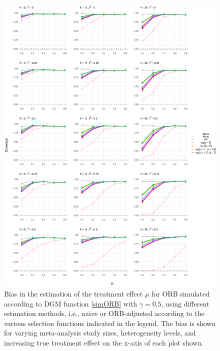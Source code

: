 \documentclass[twocolumn]{article}\usepackage[]{graphicx}\usepackage[]{xcolor}
\makeatletter
\def\maxwidth{ %
  \ifdim\Gin@nat@width>\linewidth
    \linewidth
  \else
    \Gin@nat@width
  \fi
}
\providecommand{\DIFaddbeginFL}{} %
\providecommand{\DIFaddendFL}{} %
\providecommand{\DIFdelbeginFL}{} %
\providecommand{\DIFdelendFL}{} %
\newcommand{\DIFscaledelfig}{0.5}
\newlength{\DIFdelgraphicswidth} %
\newlength{\DIFdelgraphicsheight} %
\newcommand{\DIFaddincludegraphics}[2][]{{\color{blue}\fbox{\DIFOincludegraphics[#1]{#2}}}} %
\newcommand{\DIFdelincludegraphics}[2][]{%
\sbox{\DIFdelgraphicsbox}{\DIFOincludegraphics[#1]{#2}}%
\settoboxwidth{\DIFdelgraphicswidth}{\DIFdelgraphicsbox} %
\settoboxtotalheight{\DIFdelgraphicsheight}{\DIFdelgraphicsbox} %
\scalebox{\DIFscaledelfig}{%
\parbox[b]{\DIFdelgraphicswidth}{\usebox{\DIFdelgraphicsbox}\\[-\baselineskip] \rule{\DIFdelgraphicswidth}{0em}}\llap{\resizebox{\DIFdelgraphicswidth}{\DIFdelgraphicsheight}{%
\setlength{\unitlength}{\DIFdelgraphicswidth}%
\begin{picture}(1,1)%
\thicklines\linethickness{2pt} %
{\color[rgb]{1,0,0}\put(0,0){\framebox(1,1){}}}%
{\color[rgb]{1,0,0}\put(0,0){\line( 1,1){1}}}%
{\color[rgb]{1,0,0}\put(0,1){\line(1,-1){1}}}%
\end{picture}%
}\hspace*{3pt}}} %
} %
\DeclareRobustCommand{\DIFaddbeginFL}{\DIFOaddbeginFL \let\includegraphics\DIFaddincludegraphics} %
\DeclareRobustCommand{\DIFaddendFL}{\DIFOaddendFL \let\includegraphics\DIFOincludegraphics} %
\DeclareRobustCommand{\DIFdelbeginFL}{\DIFOdelbeginFL \let\includegraphics\DIFdelincludegraphics} %
\DeclareRobustCommand{\DIFdelendFL}{\DIFOaddendFL \let\includegraphics\DIFOincludegraphics} %
\makeatother
\begin{document}
\begin{figure}[!hbt]
\centering
\caption{Bias in the estimation of the treatment effect $\mu$ for ORB simulated according to DGM function \eqref{simORB} with $\gamma=0.5$, using different estimation methods, i.e., naive or ORB-adjusted according to the various selection functions indicated in the legend. The bias is shown for varying meta-analysis study sizes, heterogeneity levels, and increasing true treatment effect on the x-axis of each plot shown.\\[0.5em]}


{\centering \DIFdelbeginFL %
\DIFdelendFL \DIFaddbeginFL \includegraphics[width=\maxwidth]{figures/plots-unnamed-chunk-6-1} 
\DIFaddendFL 

}



\label{res2}
\end{figure}
\end{document}
